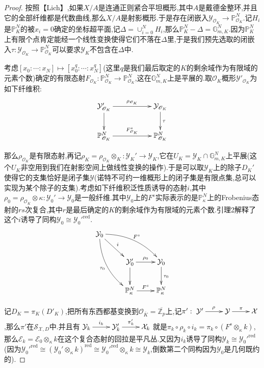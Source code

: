 \begin{enumerate}
\begin{proof}
    	\qquad
    	
    	按照【Lich】,如果$X/A$是连通正则紧合平坦概形,其中$A$是戴德金整环,并且它的全部纤维都是代数曲线,那么$X/A$是射影概形.于是存在闭嵌入$\mathcal{Y}_{\mathscr{O}_K}\to\mathbb{P}_{\mathscr{O}_K}^N$.记$H_i$是$\mathbb{P}_K^N$的被$x_i=0$确定的坐标超平面,记$\Delta=\cup_{i=0}^NH_i$,那么$\mathbb{P}_K^N-\Delta=\mathbb{G}_{m,K}^N$.因为$\mathbb{P}_K^N$上有限个点肯定能经一个线性变换使得它们不落在$\Delta$里,于是我们预先选取的闭嵌入$\tau:\mathcal{Y}_{\mathscr{O}_K}\to\mathbb{P}^N_{\mathscr{O}_K}$可以要求$\mathcal{Y}_K$不包含在$\Delta$中.
    	
    	\qquad
    	
    	考虑$[x_0:\cdots:x_N]\mapsto[x_0^q:\cdots:x_N^q]$(这里$q$是我们最后取定的$K$的剩余域作为有限域的元素个数)确定的有限态射$F_{\mathscr{O}_K}:\mathbb{P}_{\mathscr{O}_K}^N\to\mathbb{P}_{\mathscr{O}_K}^N$,这在$\mathbb{G}_{m,K}^N$上是平展的.取$\mathscr{O}_K$概形$\mathcal{Y}'_{\mathscr{O}_K}$为如下纤维积:
    	$$\xymatrix{\mathcal{Y}'_{\mathscr{O}_K}\ar[rr]^{\rho_{\mathscr{O}_K}}\ar[d]&&\mathcal{Y}_{\mathscr{O}_K}\ar[d]^{\tau}\\\mathbb{P}_{\mathscr{O}_K}^N\ar[rr]^{F^s_{\mathscr{O}_K}}&&\mathbb{P}_{\mathscr{O}_K}^N}$$
    	
    	那么$\rho_{\mathscr{O}_K}$是有限态射,再记$\rho_K=\rho_{\mathscr{O}_K}\otimes_K:\mathcal{Y}_K'\to\mathcal{Y}_K$,它在$U_K=\mathcal{Y}_K\cap\mathbb{G}_{m,K}^N$上平展(这个$U_K$非空用到我们在射影空间上做线性变换的操作).于是可以取$\mathcal{Y}_K$上的除子$D_K'$使得它的支集恰好是闭子集$\mathcal{Y}$(诺特不可约一维概形上的闭子集是有限点集,总可以实现为某个除子的支集).考虑如下纤维积泛性质诱导的态射$i$,其中$\rho_0=\rho_{\mathscr{O}_K}\otimes\kappa:\mathcal{Y}_0'\to\mathcal{Y}_0$是一般纤维.其中$\mathcal{Y}_0$上的$F^s$实际表示的是$\mathbb{P}_{\kappa}^N$上的Frobenius态射的$rs$次复合,其中$r$是最后确定的$K$的剩余域作为有限域的元素个数.引理2解释了这个$i$诱导了同构$\mathcal{Y}_0\cong{\mathcal{Y}_0'}^{\mathrm{red}}$.
    	$$\xymatrix{\mathcal{Y}_0\ar@/^1pc/[drr]^{F^s}\ar@/_1pc/[ddr]_{\tau_0}\ar[dr]^i&&\\&\mathcal{Y}_0'\ar[r]^{\rho_0}\ar[d]&\mathcal{Y}_0\ar[d]^{\tau_0}\\&\mathbb{P}_{\kappa}^N\ar[r]^{F^s}&\mathbb{P}_{\kappa}^N}$$
    	
    	记$D_K=\pi_K(D'_K)$,把所有东西都基变换到$\mathscr{O}_{\overline{K}}=\overline{\mathbb{Z}_p}$上,记$\pi':\xymatrix{\mathcal{Y}'\ar[r]^{\rho}&\mathcal{Y}\ar[r]^{\pi}&\mathcal{X}}$,那么$\pi'$在$\mathcal{S}_{\mathcal{X},D}$中.并且有$\xymatrix{\mathcal{Y}_k\ar[r]^{i_k}&\mathcal{Y}_k'\ar[r]^{\pi'_k}&\mathcal{X}_k}$就是$\pi_k\circ\rho_k\circ i_k=\pi_k\circ(F^s\otimes_{\kappa}k)$,那么$\mathcal{E}_k=\mathcal{E}_0\otimes_{\kappa}k$在这个复合态射的回拉是平凡丛.又因为$i_k$诱导了同构$\mathcal{Y}_k\cong{\mathcal{Y}_0'}^{\mathrm{red}}$(因为${\mathcal{Y}_0'}^{\mathrm{red}}\cong(\mathcal{Y}_0'\otimes_{\kappa}k)^{\mathrm{red}}\cong{\mathcal{Y}_0'}^{\mathrm{red}}\otimes_{\kappa}k\cong\mathcal{Y}_k$,倒数第二个同构因为$\mathcal{Y}_0$是几何既约的).
    	

\end{proof}
\end{enumerate}
